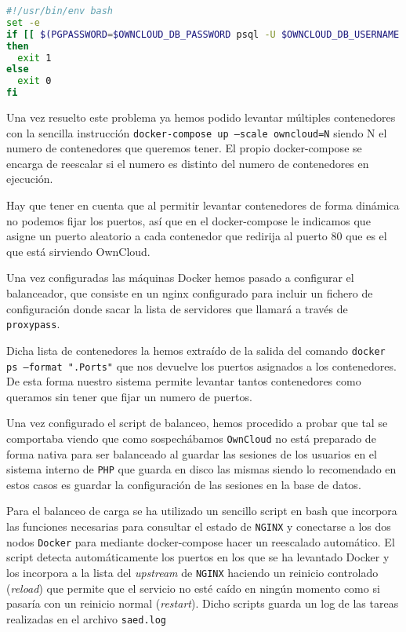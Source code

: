 \begin{lstlisting}[language=bash,caption={comprobacion de que no está previamente configurado OwnCloud}]
#!/usr/bin/env bash
set -e
if [[ $(PGPASSWORD=$OWNCLOUD_DB_PASSWORD psql -U $OWNCLOUD_DB_USERNAME -h {{database}} $OWNCLOUD_DB_NAME -tAc "SELECT to_regclass('oc_users');") != "oc_users" ]]
then
  exit 1
else
  exit 0
fi
\end{lstlisting}


Una vez resuelto este problema ya hemos podido levantar múltiples contenedores con la sencilla instrucción \texttt{docker-compose up --scale owncloud=N} siendo N el numero de contenedores que queremos tener. El propio docker-compose se encarga de reescalar si el numero es distinto del numero de contenedores en ejecución.

\bigskip
Hay que tener en cuenta que al permitir levantar contenedores de forma dinámica no podemos fijar los puertos, así que en el docker-compose le indicamos que asigne un puerto aleatorio a cada contenedor que redirija al puerto 80 que es el que está sirviendo OwnCloud.

\bigskip
Una vez configuradas las máquinas Docker hemos pasado a configurar el balanceador, que consiste en un nginx  configurado para incluir un fichero de configuración donde sacar la lista de servidores que llamará a través de \texttt{proxypass}.

\bigskip
Dicha lista de contenedores la hemos extraído de la salida del comando \texttt{docker ps --format "{{.Ports}}"} que nos devuelve los puertos asignados a los contenedores. De esta forma nuestro sistema permite levantar tantos contenedores como queramos sin tener que fijar un numero de puertos.

\bigskip
Una vez configurado el script de balanceo, hemos procedido a probar que tal se comportaba viendo que como sospechábamos \texttt{OwnCloud} no está preparado de forma nativa para ser balanceado al guardar las sesiones de los usuarios en el sistema interno de \texttt{PHP} que guarda en disco las mismas siendo lo recomendado en estos casos es guardar la configuración de las sesiones en la base de datos.

\bigskip
Para el balanceo de carga se ha utilizado un sencillo script en bash que incorpora las funciones necesarias para consultar el estado de \texttt{NGINX} y conectarse a los dos nodos \texttt{Docker} para mediante docker-compose hacer un reescalado automático. El script detecta automáticamente los puertos en los que se ha levantado Docker y los incorpora a la lista del \textit{upstream} de \texttt{NGINX} haciendo un reinicio controlado (\textit{reload}) que permite que el servicio no esté caído en ningún momento como si pasaría con un reinicio normal (\textit{restart}). Dicho scripts guarda un log de las tareas realizadas en el archivo \texttt{saed.log}


